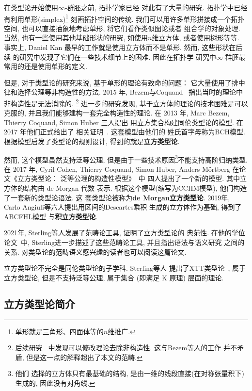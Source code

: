 在类型论开始使用\(\infty\)-群胚之前, 拓扑学家已经
对此有了大量的研究. 拓扑学中已经有利用单形(simplex)\footnote{单形就是三角形、四面体等的\(n\)维推广.}
刻画拓扑空间的传统. 我们可以用许多单形拼接成一个拓扑空间,
也可以直接抽象地考虑单形, 将它们看作类似图论或者
组合学的对象处理. 当然, 也有一些使用其他基础形状的研究,
如使用\(n\)维立方体, 或者使用树形等等. 事实上, Daniel Kan
最早的工作就是使用立方体而不是单形. 然而, 这些形状在后续
的研究中发现了它们在一些技术细节上的困难. 因此在拓扑学
研究中\(\infty\)-群胚最常用的还是使用单形的定义.

但是, 对于类型论的研究来说, 基于单形的理论有致命的问题：
它大量使用了排中律和选择公理等非构造性的方法. 2015
年, Bezem与Coquand~\cite{bezem:2015:simplicial}
指出当时的理论中非构造性是无法消除的.%
\footnote{后续研究~\cite{henry:2019:constructive}
中发现可以修改理论去除非构造性. 这与Bezem等人的工作
并不矛盾, 但是这一点的解释超出了本文的范畴.}
进一步的研究发现, 基于立方体的理论的技术困难是可以克服的,
并且我们能够建构一套完全构造性的理论. 在 2013 年,
Marc Bezem, Thierry Coquand, Simon Huber 三人提出
用立方集合构建同伦类型论的模型. 在 2017 年他们正式给出了
相关证明~\cite{bch:2017:cubical}. 这套模型由他们的
姓氏首字母称为BCH模型. 根据模型启发了类型论的规则设计,
得到的就是\textbf{立方类型论}.

然而, 这个模型虽然支持泛等公理, 但是由于一些技术原因\footnote{他们
选择的立方体只有最基础的结构, 是由一维的线段直接(在对称张量积下)生成的,
因此没有对角线.}不能支持高阶归纳类型. 在 2017 年,
Cyril Cohen, Thierry Coquand, Simon Huber, Anders M\"ortberg
在论文《立方类型论： 泛等公理的构造性模型》~\cite{abcfhl:2021:cubical}中
四人提出了一个新的模型. 其中立方体的结构由 de Morgan 代数
表示. 根据这个模型(缩写为CCHM模型), 他们构造了一套新的类型论语法. 这
套类型论被称为\textbf{de Morgan立方类型论}.
2019年, Carlo Angiuli等六人提出用区间的Descartes乘积
生成的立方体作为基础, 得到了ABCFHL模型
与\textbf{积立方类型论}.

2021年, Sterling等人发展了范畴论工具, 证明了立方类型论的
典范性. 在他的学位论文~\cite{sterling:2021:thesis}中,
Sterling进一步描述了这些范畴论工具, 并且指出语法与语义研究
之间的关系. 对类型论的范畴语义感兴趣的读者也可以阅读这篇论文.

立方类型论不完全是同伦类型论的子学科. Sterling等人
提出了XTT类型论~\cite{sterling:2019:xtt}, 属于立方类型论,
但是不支持泛等公理, 属于集合 (即满足 K 原理) 层面的理论.

\subsection{立方类型论简介}

